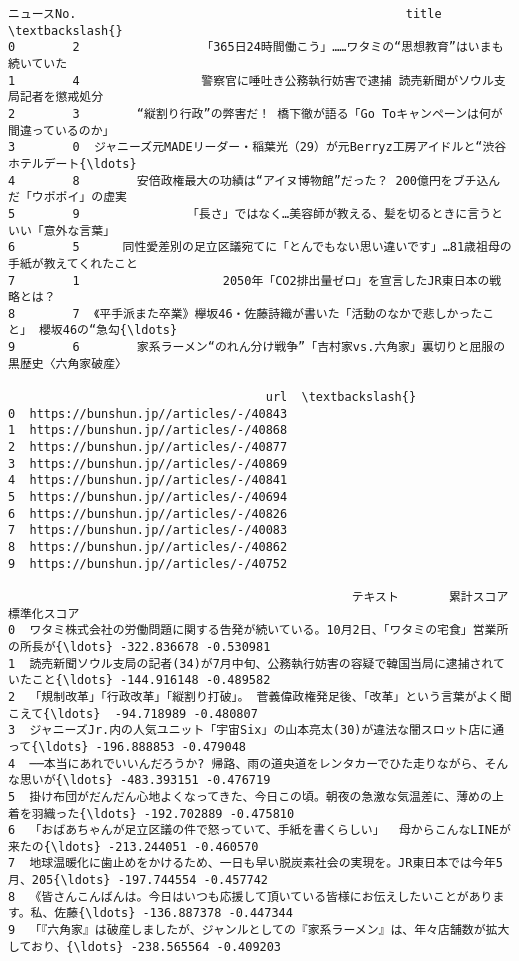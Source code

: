 \documentclass[11pt]{article}
\makeatletter
\newcommand{\boxspacing}{\kern\kvtcb@left@rule\kern\kvtcb@boxsep}
\newcommand{\prompt}[4]{
        \ttfamily\llap{{\color{#2}[#3]:\hspace{3pt}#4}}\vspace{-\baselineskip}
    }
\makeatother
\begin{document}
            \begin{tcolorbox}[breakable, size=fbox, boxrule=.5pt, pad at break*=1mm, opacityfill=0]
\prompt{Out}{outcolor}{13}{\boxspacing}
\begin{Verbatim}[commandchars=\\\{\}]
   ニュースNo.                                              title  \textbackslash{}
0        2                 「365日24時間働こう」……ワタミの“思想教育”はいまも続いていた
1        4                 警察官に唾吐き公務執行妨害で逮捕 読売新聞がソウル支局記者を懲戒処分
2        3        “縦割り行政”の弊害だ！ 橋下徹が語る「Go Toキャンペーンは何が間違っているのか」
3        0  ジャニーズ元MADEリーダー・稲葉光（29）が元Berryz工房アイドルと“渋谷ホテルデート{\ldots}
4        8        安倍政権最大の功績は“アイヌ博物館”だった？ 200億円をブチ込んだ「ウポポイ」の虚実
5        9               「長さ」ではなく…美容師が教える、髪を切るときに言うといい「意外な言葉」
6        5      同性愛差別の足立区議宛てに「とんでもない思い違いです」…81歳祖母の手紙が教えてくれたこと
7        1                    2050年「CO2排出量ゼロ」を宣言したJR東日本の戦略とは？
8        7  《平手派また卒業》欅坂46・佐藤詩織が書いた「活動のなかで悲しかったこと」 櫻坂46の“急勾{\ldots}
9        6        家系ラーメン“のれん分け戦争”「吉村家vs.六角家」裏切りと屈服の黒歴史〈六角家破産〉

                                    url  \textbackslash{}
0  https://bunshun.jp//articles/-/40843
1  https://bunshun.jp//articles/-/40868
2  https://bunshun.jp//articles/-/40877
3  https://bunshun.jp//articles/-/40869
4  https://bunshun.jp//articles/-/40841
5  https://bunshun.jp//articles/-/40694
6  https://bunshun.jp//articles/-/40826
7  https://bunshun.jp//articles/-/40083
8  https://bunshun.jp//articles/-/40862
9  https://bunshun.jp//articles/-/40752

                                                テキスト       累計スコア    標準化スコア
0  ワタミ株式会社の労働問題に関する告発が続いている。10月2日、「ワタミの宅食」営業所の所長が{\ldots} -322.836678 -0.530981
1  読売新聞ソウル支局の記者(34)が7月中旬、公務執行妨害の容疑で韓国当局に逮捕されていたこと{\ldots} -144.916148 -0.489582
2  「規制改革」「行政改革」「縦割り打破」。 菅義偉政権発足後、「改革」という言葉がよく聞こえて{\ldots}  -94.718989 -0.480807
3  ジャニーズJr.内の人気ユニット「宇宙Six」の山本亮太(30)が違法な闇スロット店に通って{\ldots} -196.888853 -0.479048
4  ──本当にあれでいいんだろうか? 帰路、雨の道央道をレンタカーでひた走りながら、そんな思いが{\ldots} -483.393151 -0.476719
5  掛け布団がだんだん心地よくなってきた、今日この頃。朝夜の急激な気温差に、薄めの上着を羽織った{\ldots} -192.702889 -0.475810
6  「おばあちゃんが足立区議の件で怒っていて、手紙を書くらしい」  母からこんなLINEが来たの{\ldots} -213.244051 -0.460570
7  地球温暖化に歯止めをかけるため、一日も早い脱炭素社会の実現を。JR東日本では今年5月、205{\ldots} -197.744554 -0.457742
8  《皆さんこんばんは。今日はいつも応援して頂いている皆様にお伝えしたいことがあります。私、佐藤{\ldots} -136.887378 -0.447344
9  「『六角家』は破産しましたが、ジャンルとしての『家系ラーメン』は、年々店舗数が拡大しており、{\ldots} -238.565564 -0.409203
\end{Verbatim}
\end{tcolorbox}
        
\end{document}
